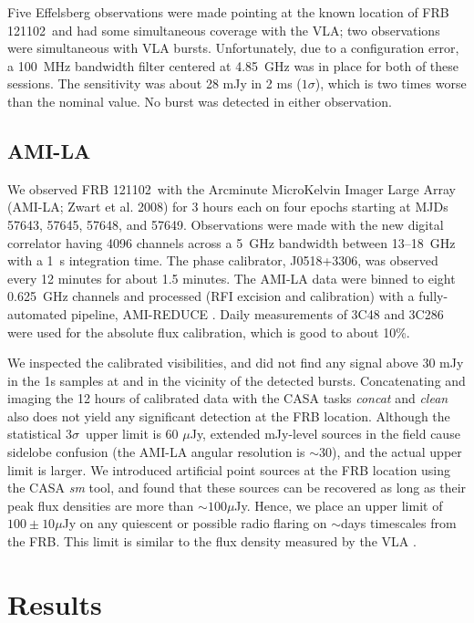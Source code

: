 \documentclass[twocolumn]{aastex61}
\newcommand{\frb}{FRB 121102}
\begin{document}
Five Effelsberg observations were made pointing at the known location of \frb\ and had some simultaneous coverage with the VLA; two observations were simultaneous with VLA bursts. Unfortunately, due to a configuration error, a 100~MHz bandwidth filter centered at 4.85~GHz was in place for both of these sessions. The sensitivity was about 28 mJy in 2 ms ($1\sigma$), which is two times worse than the nominal value. No burst was detected in either observation.

\subsection{AMI-LA}

We observed \frb\ with the Arcminute MicroKelvin Imager Large Array (AMI-LA; Zwart et al. 2008) for 3 hours each on four epochs starting at MJDs 57643, 57645, 57648, and 57649. Observations were made with the new digital correlator having 4096 channels across a 5~GHz bandwidth between 13--18~GHz with a 1~s integration time. The phase calibrator, J0518+3306, was observed every 12 minutes for about 1.5 minutes. The AMI-LA data were binned to eight 0.625~GHz channels and processed (RFI excision and calibration) with a fully-automated pipeline, AMI-REDUCE \citep[e.g.,][]{2013MNRAS.429.3330P}. Daily measurements of 3C48 and 3C286 were used for the absolute flux calibration, which is good to about 10\%. 

We inspected the calibrated visibilities, and did not find any signal above 30 mJy in the 1s samples at and in the vicinity of the detected bursts. Concatenating and imaging the 12 hours of calibrated data with the CASA tasks {\it concat} and {\it clean} also does not yield any significant detection at the FRB location. Although the statistical $3\sigma$\ upper limit is 60 $\mu$Jy, extended mJy-level sources in the field cause sidelobe confusion (the AMI-LA angular resolution is $\sim$30\arcsec), and the actual upper limit is larger. We introduced artificial point sources at the FRB location using the CASA {\it sm} tool, and found that these sources can be recovered as long as their peak flux densities are more than $\sim100\mu$Jy. Hence, we place an upper limit of $100\pm10 \mu$Jy on any quiescent or possible radio flaring on $\sim$days timescales from the FRB. This limit is similar to the flux density measured by the VLA \citep{LOC}.

\section{Results}
\label{sec:res}
\end{document}
